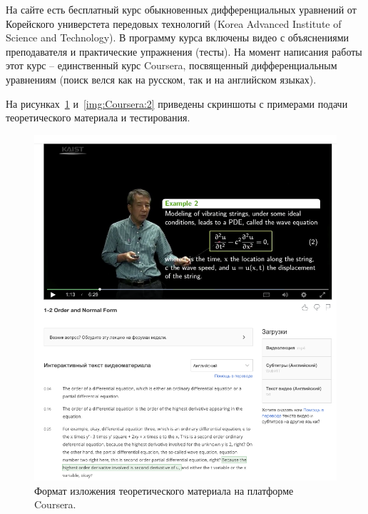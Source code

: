 \documentclass[14pt,russian]{extarticle}
\begin{document}
На сайте есть бесплатный курс обыкновенных дифференциальных уравнений от Корейского универстета передовых технологий (Korea Advanced Institute of Science and Technology). В программу курса включены видео с объяснениями преподавателя и практические упражнения (тесты). На момент написания работы этот курс -- единственный курс Coursera, посвященный дифференциальным уравнениям (поиск велся как на русском, так и на английском языках).

На рисунках~\ref{img:Coursera:1} и~\ref{img:Coursera:2} приведены скриншоты с примерами подачи теоретического материала и тестирования.


\begin{figure}[h!]
	\centering
		\includegraphics[height=.4\textheight]{img/Coursera/pic2.png}
	\caption{Формат изложения теоретического материала на платформе Coursera.}
	\label{img:Coursera:1}
\end{figure}
\end{document}

